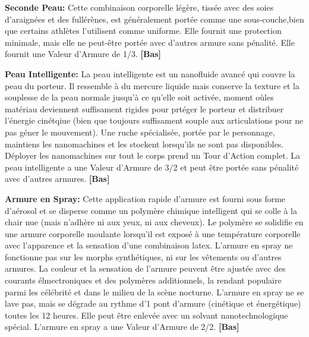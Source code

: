 \textbf{Seconde Peau:} Cette combinaison corporelle légère, tissée avec des soies d'araignées et des fullérènes, est généralement portée comme une sous-couche,bien que certains athlètes l'utilisent comme uniforme. Elle fournit une protection minimale, mais elle ne peut-être portée avec d'autres armure sans pénalité. Elle fournit une Valeur d'Armure de 1/3. \textbf{[Bas]} 

\textbf{Peau Intelligente:} La peau intelligente est un nanofluide avancé qui couvre la peau du porteur. Il ressemble à du mercure liquide mais conserve la texture et la souplesse de la peau normale jusqu'à ce qu'elle soit activée, moment oùles matériau deviennent suffisament rigides pour prtéger le porteur et distribuer l'énergie cinétqiue (bien que toujours suffisament souple aux articulations pour ne pas géner le mouvement). Une ruche spécialisée, portée par le personnage, maintiens les nanomachines et les stockent lorsqu'ils ne sont pas disponibles. Déployer les nanomachines sur tout le corps prend un Tour d'Action complet. La peau intelligente a une Valeur d'Armure de 3/2 et peut être portée sans pénalité avec d'autres armures. \textbf{[Bas]} 

\textbf{Armure en Spray:} Cette application rapide d'armure est fourni sous forme d'aérosol et se disperse comme un polymère chimique intelligent qui se colle à la chair nue (mais n'adhère ni aux yeux, ni aux cheveux). Le polymère se solidifie en une armure corporelle moulante lorsqu'il est exposé à une température corporelle avec l'apparence et la sensation d'une combinaison latex. L'armure en spray ne fonctionne pas sur les morphs synthétiques, ni sur les vêtements ou d'autres armures. La couleur et la sensation de l'armure peuvent être ajustée avec des courants élmectroniques et des polymères additionnels, la rendant populaire parmi les célébrité et dans le milieu de la scène nocturne. L'armure en spray ne se lave pas, mais se dégrade au rythme d'1 pont d'armure (cinétique et énergétique) toutes les 12 heures. Elle peut être enlevée avec un solvant nanotechnologique spécial. L'armure en spray a une Valeur d'Armure de 2/2. \textbf{[Bas]} 

